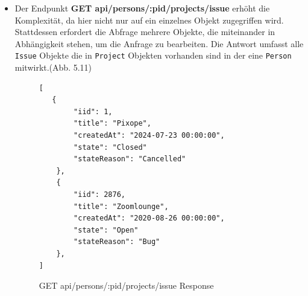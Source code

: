 \begin{itemize}
\begin{figure}[H]
\begin{center}
\begin{BVerbatim}
[
    {
        "pid": 1,
        "firstname": "Ruby",
        "lastname": "Burchatt",
        "email": "rburchatt0@msn.com"
    },
	[...]
    {
        "pid": 5000,
        "firstname": "Murdoch",
        "lastname": "Simonitto",
        "email": "msimonittorr@google.ca"
    }
]
\end{BVerbatim}
\end{center}
\caption{GET api/persons Response}
\end{figure}

\item Der Endpunkt \colorbox{gray!20}{\textbf{GET api/persons/:pid/projects/issue}} erhöht die Komplexität, da hier nicht nur auf ein einzelnes Objekt zugegriffen wird. Stattdessen erfordert die Abfrage mehrere Objekte, die miteinander in Abhängigkeit stehen, um die Anfrage zu bearbeiten. Die Antwort umfasst alle  \texttt{Issue} Objekte die in  \texttt{Project} Objekten vorhanden sind in der eine  \texttt{Person} mitwirkt.(Abb. 5.11)
\begin{figure}[H]
\begin{center}
\begin{BVerbatim}
[
   {
        "iid": 1,
        "title": "Pixope",
        "createdAt": "2024-07-23 00:00:00",
        "state": "Closed"
        "stateReason": "Cancelled"
    },
    {
        "iid": 2876,
        "title": "Zoomlounge",
        "createdAt": "2020-08-26 00:00:00",
        "state": "Open"
        "stateReason": "Bug"
    },
]
\end{BVerbatim}
\end{center}
\caption{GET api/persons/:pid/projects/issue Response}
\end{figure}


\end{itemize}
